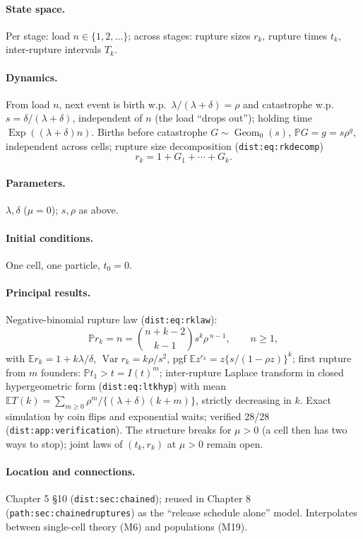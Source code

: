 \documentclass[11pt,a4paper]{article}
\newcommand{\PR}{\mathbb{P}}
\newcommand{\EX}{\mathbb{E}}
\newcommand{\Var}{\operatorname{Var}}
\newcommand{\Geom}{\operatorname{Geom}}
\newcommand{\Exp}{\operatorname{Exp}}
\begin{document}
\paragraph{State space.} Per stage: load $n\in\{1,2,\ldots\}$; across
stages: rupture sizes $r_k$, rupture times $t_k$, inter-rupture intervals
$T_k$.

\paragraph{Dynamics.} From load $n$, next event is birth w.p.\
$\lambda/(\lambda+\delta)=\rho$ and catastrophe w.p.\
$s=\delta/(\lambda+\delta)$, independent of $n$ (the load ``drops out'');
holding time $\Exp((\lambda+\delta)n)$. Births before catastrophe
$G\sim\Geom_0(s)$, $\PR{G=g}=s\rho^g$, independent across cells; rupture
size decomposition (\texttt{dist:eq:rkdecomp})
\[
r_k=1+G_1+\cdots+G_k .
\]

\paragraph{Parameters.} $\lambda,\delta$ ($\mu=0$); $s,\rho$ as above.

\paragraph{Initial conditions.} One cell, one particle, $t_0=0$.

\paragraph{Principal results.} Negative-binomial rupture law
(\texttt{dist:eq:rklaw}):
\[
\PR{r_k=n}=\binom{n+k-2}{k-1}s^k\rho^{\,n-1},\qquad n\ge1,
\]
with $\EX{r_k}=1+k\lambda/\delta$, $\Var{r_k}=k\rho/s^2$, pgf
$\EX{z^{r_k}}=z\{s/(1-\rho z)\}^k$; first rupture from $m$ founders:
$\PR{t_1>t}=I(t)^m$; inter-rupture Laplace transform in closed
hypergeometric form (\texttt{dist:eq:ltkhyp}) with mean
$\EX{T(k)}=\sum_{m\ge0}\rho^m/\{(\lambda+\delta)(k+m)\}$, strictly
decreasing in $k$. Exact simulation by coin flips and exponential waits;
verified 28/28 (\texttt{dist:app:verification}). The structure breaks for
$\mu>0$ (a cell then has two ways to stop); joint laws of $(t_k,r_k)$ at
$\mu>0$ remain open.

\paragraph{Location and connections.} Chapter 5 \S10
(\texttt{dist:sec:chained}); reused in Chapter 8
(\texttt{path:sec:chainedruptures}) as the ``release schedule alone''
model. Interpolates between single-cell theory (M6) and populations (M19).
\end{document}
